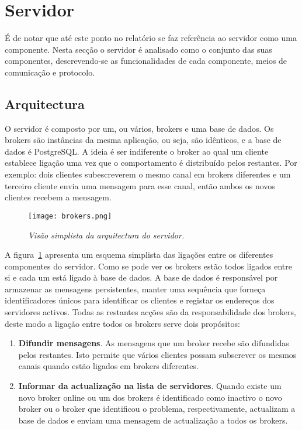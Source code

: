 \section{Servidor}

É de notar que até este ponto no relatório se faz referência ao servidor como uma componente.
Nesta secção o servidor é analisado como o conjunto das suas componentes, descrevendo-se as funcionalidades de cada componente, meios de comunicação e protocolo.

\subsection{Arquitectura}

O servidor é composto por um, ou vários, brokers e uma base de dados. Os brokers são instâncias da mesma aplicação, ou seja, são idênticos, e a base de dados é PostgreSQL. A ideia é ser indiferente o broker ao qual um cliente establece ligação uma vez que o comportamento é distribuído pelos restantes.
Por exemplo: dois clientes subescreverem o mesmo canal em brokers diferentes e um terceiro cliente envia uma mensagem para esse canal, então ambos os novos clientes recebem a mensagem.

\begin{figure}[H]
\centering
\texttt{[image: brokers.png]}
\caption{\textit{Visão simplista da arquitectura do servidor.}}
\label{fig:brokers-arq}
\end{figure}

A figura~\ref{fig:brokers-arq} apresenta um esquema simplista das ligações entre os diferentes componentes do servidor. Como se pode ver os brokers estão todos ligados entre si e cada um está ligado à base de dados.
A base de dados é responsável por armazenar as mensagens persistentes, manter uma sequência que forneça identificadores únicos para identificar os clientes e registar os endereços dos servidores activos. Todas as restantes acções são da responsabilidade dos brokers, deste modo a ligação entre todos os brokers serve dois propósitos:

\begin{enumerate}
\item \textbf{Difundir mensagens}. As mensagens que um broker recebe são difundidas pelos restantes. Isto permite que vários clientes possam subscrever os mesmos canais quando estão ligados em brokers diferentes.
\item \textbf{Informar da actualização na lista de servidores}. Quando existe um novo broker online ou um dos brokers é identificado como inactivo o novo broker ou o broker que identificou o problema, respectivamente, actualizam a base de dados e enviam uma mensagem de actualização a todos os brokers.
\end{enumerate}

